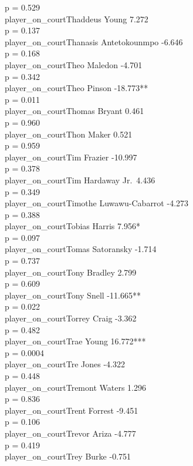 \documentclass[
  landscape]{article}
\begin{document}
p = 0.529\\
player\_on\_courtThaddeus Young 7.272\\
p = 0.137\\
player\_on\_courtThanasis Antetokounmpo -6.646\\
p = 0.168\\
player\_on\_courtTheo Maledon -4.701\\
p = 0.342\\
player\_on\_courtTheo Pinson -18.773**\\
p = 0.011\\
player\_on\_courtThomas Bryant 0.461\\
p = 0.960\\
player\_on\_courtThon Maker 0.521\\
p = 0.959\\
player\_on\_courtTim Frazier -10.997\\
p = 0.378\\
player\_on\_courtTim Hardaway Jr.~4.436\\
p = 0.349\\
player\_on\_courtTimothe Luwawu-Cabarrot -4.273\\
p = 0.388\\
player\_on\_courtTobias Harris 7.956*\\
p = 0.097\\
player\_on\_courtTomas Satoransky -1.714\\
p = 0.737\\
player\_on\_courtTony Bradley 2.799\\
p = 0.609\\
player\_on\_courtTony Snell -11.665**\\
p = 0.022\\
player\_on\_courtTorrey Craig -3.362\\
p = 0.482\\
player\_on\_courtTrae Young 16.772***\\
p = 0.0004\\
player\_on\_courtTre Jones -4.322\\
p = 0.448\\
player\_on\_courtTremont Waters 1.296\\
p = 0.836\\
player\_on\_courtTrent Forrest -9.451\\
p = 0.106\\
player\_on\_courtTrevor Ariza -4.777\\
p = 0.419\\
player\_on\_courtTrey Burke -0.751\\
\end{document}
